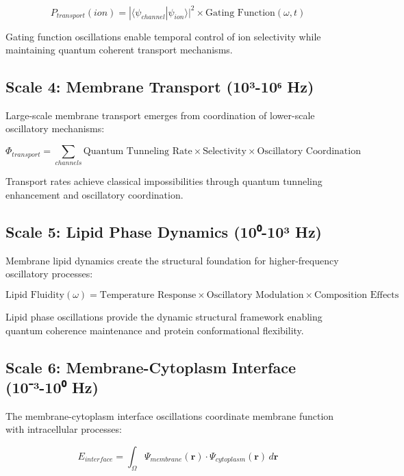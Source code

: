 \documentclass[12pt,a4paper]{article}
\begin{document}
\begin{equation}
P_{transport}(ion) = |\langle\psi_{channel}|\psi_{ion}\rangle|^2 \times \text{Gating Function}(\omega, t)
\end{equation}

Gating function oscillations enable temporal control of ion selectivity while maintaining quantum coherent transport mechanisms.

\subsection{Scale 4: Membrane Transport (10³-10⁶ Hz)}

Large-scale membrane transport emerges from coordination of lower-scale oscillatory mechanisms:

\begin{equation}
\Phi_{transport} = \sum_{channels} \text{Quantum Tunneling Rate} \times \text{Selectivity} \times \text{Oscillatory Coordination}
\end{equation}

Transport rates achieve classical impossibilities through quantum tunneling enhancement and oscillatory coordination.

\subsection{Scale 5: Lipid Phase Dynamics (10⁰-10³ Hz)}

Membrane lipid dynamics create the structural foundation for higher-frequency oscillatory processes:

\begin{equation}
\text{Lipid Fluidity}(\omega) = \text{Temperature Response} \times \text{Oscillatory Modulation} \times \text{Composition Effects}
\end{equation}

Lipid phase oscillations provide the dynamic structural framework enabling quantum coherence maintenance and protein conformational flexibility.

\subsection{Scale 6: Membrane-Cytoplasm Interface (10⁻³-10⁰ Hz)}

The membrane-cytoplasm interface oscillations coordinate membrane function with intracellular processes:

\begin{equation}
E_{interface} = \int_{\Omega} \Psi_{membrane}(\mathbf{r}) \cdot \Psi_{cytoplasm}(\mathbf{r}) \, d\mathbf{r}
\end{equation}
\end{document}
